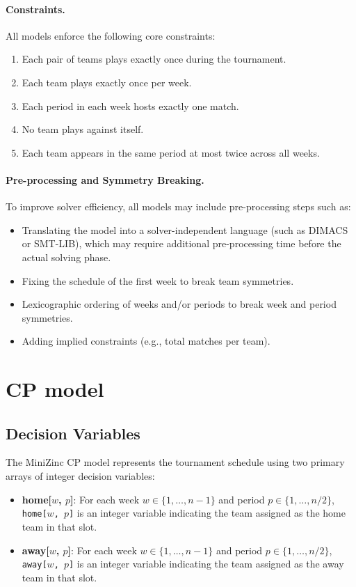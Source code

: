 \documentclass[11pt]{article}
\begin{document}
\paragraph{Constraints.}
All models enforce the following core constraints:
\begin{enumerate}
    \item Each pair of teams plays exactly once during the tournament.
    \item Each team plays exactly once per week.
    \item Each period in each week hosts exactly one match.
    \item No team plays against itself.
    \item Each team appears in the same period at most twice across all weeks.
\end{enumerate}

\paragraph{Pre-processing and Symmetry Breaking.}
To improve solver efficiency, all models may include pre-processing steps such as:
\begin{itemize}
    \item Translating the model into a solver-independent language (such as DIMACS or SMT-LIB), which may require additional pre-processing time before the actual solving phase. 
    \item Fixing the schedule of the first week to break team symmetries.
    \item Lexicographic ordering of weeks and/or periods to break week and period symmetries.
    \item Adding implied constraints (e.g., total matches per team).
\end{itemize}

\section{CP model}

\subsection{Decision Variables}

The MiniZinc CP model represents the tournament schedule using two primary arrays of integer decision variables:

\begin{itemize}
    \item \textbf{home[$w$, $p$]}: For each week $w \in \{1, \ldots, n-1\}$ and period $p \in \{1, \ldots, n/2\}$, \texttt{home[$w$, $p$]} is an integer variable indicating the team assigned as the home team in that slot.
    \item \textbf{away[$w$, $p$]}: For each week $w \in \{1, \ldots, n-1\}$ and period $p \in \{1, \ldots, n/2\}$, \texttt{away[$w$, $p$]} is an integer variable indicating the team assigned as the away team in that slot.
\end{itemize}
\end{document}
